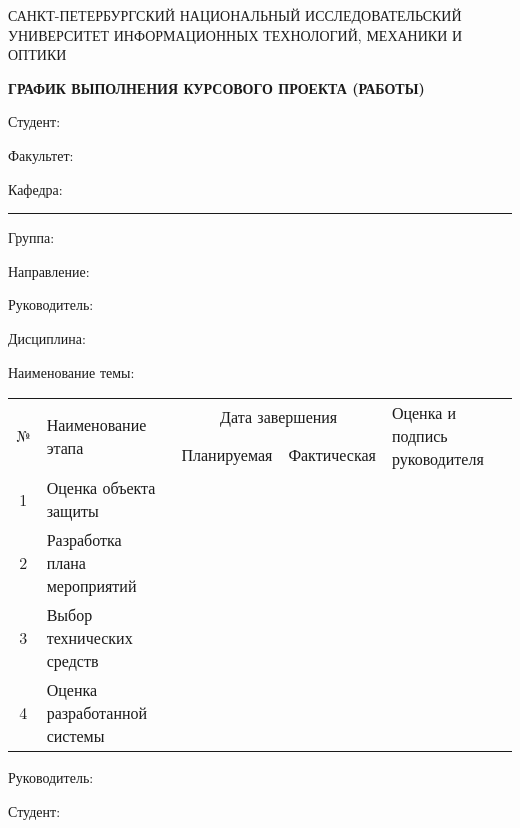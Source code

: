 \thispagestyle{empty}


\begin{center}
{\small САНКТ-ПЕТЕРБУРГСКИЙ НАЦИОНАЛЬНЫЙ ИССЛЕДОВАТЕЛЬСКИЙ УНИВЕРСИТЕТ ИНФОРМАЦИОННЫХ ТЕХНОЛОГИЙ, МЕХАНИКИ И ОПТИКИ}

\textbf{ГРАФИК ВЫПОЛНЕНИЯ КУРСОВОГО ПРОЕКТА (РАБОТЫ)}
\end{center}

Студент:  

Факультет: 

Кафедра: \rule{10em}{.1pt} Группа: 

Направление:  

Руководитель: 

Дисциплина: 

\hrulefill

Наименование темы: 

\hrulefill

\begin{table}[h!]
	\centering
		\begin{tabular}{|c|p{5cm}|c|c|p{3cm}|}
			\hline
			\multirow{2}{*}{№} & \multirow{2}{*}{Наименование этапа} & \multicolumn{2}{c|}{Дата завершения} & \multirow{2}{*}{\parbox{3cm}{Оценка и подпись руководителя}} \\ \cline{3-4}
			&                                     & Планируемая       & Фактическая      &                                                \\ \hline
			1                  & Оценка объекта защиты                                    &                   &                  &                                                \\ \hline
			2                  & Разработка плана мероприятий                                     &                   &                  &                                                \\ \hline
			3                  & Выбор технических средств                                     &                   &                  &                                                \\ \hline
			4                  & Оценка разработанной системы                                    &                   &                  &                                                \\ \hline 
		\end{tabular}
		
\end{table}

\vfill


Руководитель: \hrulefill

Студент: \hrulefill
